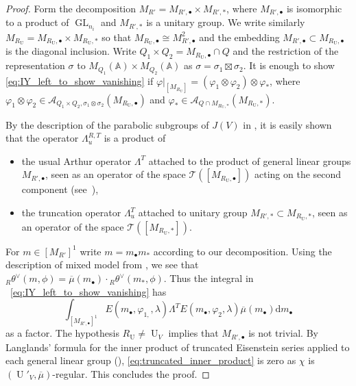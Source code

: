 \documentclass[letterpaper,11pt]{amsart}
\newcommand{\bA}{\mathbb{A}}
\newcommand{\cA}{\mathcal{A}}
\newcommand{\cT}{\mathcal{T}}
\newcommand{\rd}{\mathrm{d}}
\newcommand{\<}{\negthickspace}
\DeclareMathOperator{\GL}{GL}
\DeclareMathOperator{\U}{U}
\theoremstyle{definition}
\theoremstyle{plain}
\theoremstyle{remark}
\numberwithin{equation}{section}
\begin{document}
\begin{proof}
Form the decomposition $M_{R'}=M_{R',\bullet} \times M_{R',*}$, where
$M_{R',\bullet}$ is isomorphic to a product of $\GL_{n_i}$ and $M_{R',*}$ is
a unitary group. We write similarly $M_{R_{\U}}=M_{R_{\U},\bullet}\times M_{R_{\U},*}$ so that $M_{R_{\U},\bullet} \cong M_{R',\bullet}^2$ and the embedding $M_{R',\bullet} \subset M_{R_{\U},\bullet}$ is the diagonal inclusion. Write $Q_1 \times Q_2=M_{R_{\U},\bullet} \cap Q$ and the restriction of the representation $\sigma$ to $M_{Q_1}(\bA) \times M_{Q_2}(\bA)$ as $\sigma=\sigma_1 \boxtimes \sigma_2$. It is enough to show \eqref{eq:IY_left_to_show_vanishing} if 
$\varphi|_{[M_{R_{\U}}]} = (\varphi_1 \otimes \varphi_2) \otimes \varphi_*$, where
$\varphi_1 \otimes \varphi_2 \in \cA_{{Q_1 \times Q_2},\sigma_1 \otimes \sigma_2}(M_{R_{\U},\bullet})$ and
$\varphi_* \in \cA_{{Q \cap M_{R_{\U},*}}}(M_{R_{\U},*})$. 

By the description of the parabolic subgroups of $J(V)$ in \cite[Section~4.3]{BLX1}, it is easily shown that the operator $\Lambda_u^{R,T}$ is a product of
\begin{itemize}
    \item the usual Arthur operator $\Lambda^T$ attached to the product of general linear groups $M_{R',\bullet}$, seen as an operator of the space $\cT([M_{R_{\U},\bullet}])$ acting on the second component (see~\cite{Arthur4}),
    \item the truncation operator $\Lambda_u^T$ attached to unitary group $M_{R',*} \subset M_{R_{\U},*}$, seen as an operator of the space $\cT([M_{R_{\U},*}])$.
\end{itemize}

For $m \in [M_{R'}]^1$ write $m=m_\bullet m_*$ according to our decomposition.
Using the description of mixed model from \cite[Section~4.4]{BLX1}, we see that ${}_R
\theta^\vee(m,\phi)=\overline{\mu}(m_\bullet) \cdot {}_{R}\theta^\vee
(m_*,\phi)$. Thus the integral in ~\eqref{eq:IY_left_to_show_vanishing} has
\begin{equation}
\label{eq:truncated_inner_product}
        \int_{[M_{R',\bullet}]^1} E(m_\bullet ,\varphi_{1,},\lambda)
    \Lambda^T E(m_\bullet,\varphi_{2},\lambda) \overline{\mu}(m_\bullet)
    \rd m_\bullet
\end{equation}
as a factor. The hypothesis $R_{\U} \neq \U_V$ implies that $M_{R',\bullet}$ is not trivial. By Langlands' formula for the inner product of truncated Eisenstein series applied to each general linear group (\cite{Arthur4}), \eqref{eq:truncated_inner_product} is zero as $\chi$ is $(\U'_V,\overline{\mu})$-regular. This concludes the proof.
\end{proof}
\end{document}
